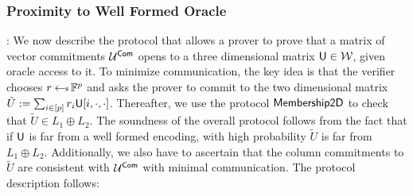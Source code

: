\subsubsection{Proximity to Well Formed Oracle}: We now describe the protocol
that allows a prover to prove that a matrix of vector commitments $\mathcal{U}^{\mathsf{Com}}$ opens to a three
dimensional matrix $\mathsf{U}\in \mathcal{W}$, given oracle access to it. To minimize communication, the key idea is that the verifier chooses
$r\hskip2.3pt{\gets\!\!\mbox{\tiny${\$}$\normalsize}}\, \mathbb{F}^p$ and asks the prover to commit to the two dimensional
matrix $\tilde{U}:=\sum_{i\in [p]}r_i\mathsf{U}[i,\cdot,\cdot]$. Thereafter, we use the protocol
$\mathsf{Membership2D}$ to check that $\tilde{U}\in L_1\oplus L_2$. The soundness of the overall
protocol follows from the fact that if $\mathsf{U}$ is far from a well formed
encoding, with high probability $\tilde{U}$ is far from $L_1\oplus L_2$.
Additionally, we also have to ascertain that the column commitments to
$\tilde{U}$ are consistent with $\mathcal{U}^{\mathsf{Com}}$ with minimal communication. The
protocol description follows:
